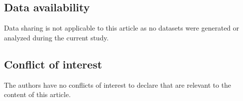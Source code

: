 \documentclass[11pt, a4paper, oneside, final, reqno]{amsart}
\theoremstyle{definition}
\theoremstyle{plain}
\theoremstyle{remark}
\numberwithin{equation}{section}
\begin{document}
\subsection*{Data availability}

Data sharing is not applicable to this article as no datasets were generated or analyzed during the current study.

\subsection*{Conflict of interest}

The authors have no conflicts of interest to declare that are relevant to the content of this article.

\printbibliography
\end{document}
